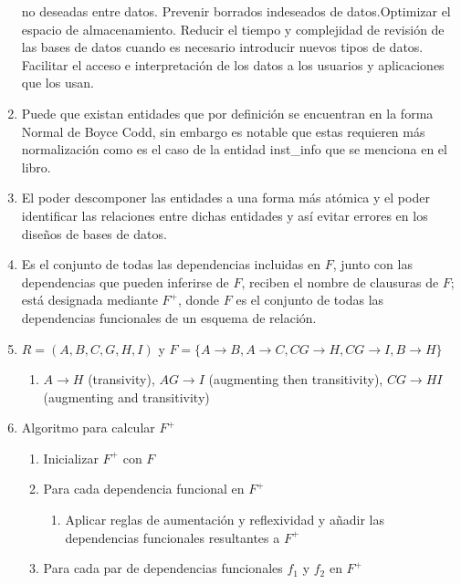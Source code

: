 \documentclass[twoside]{article}
\begin{document}
\begin{enumerate}
            no deseadas entre datos. Prevenir borrados indeseados de datos.Optimizar el espacio de almacenamiento.
            Reducir el tiempo y complejidad de revisión de las bases de datos cuando es necesario introducir nuevos tipos de datos.
            Facilitar el acceso e interpretación de los datos a los usuarios y aplicaciones que los usan.
      \item Puede que existan entidades que por definición se encuentran en la forma Normal de Boyce Codd, sin embargo es notable que
            estas requieren más normalización como es el caso de la entidad inst\_info que se menciona en el libro.
      \item El poder descomponer las entidades a una forma más atómica y el poder identificar las relaciones entre dichas entidades y así
            evitar errores en los diseños de bases de datos.
      \item Es el conjunto de todas las dependencias incluidas en $F$, junto con las dependencias que pueden inferirse de $F$, reciben el nombre
            de clausuras de $F$; está designada mediante $F^+$, donde $F$ es el conjunto de todas las dependencias funcionales de un esquema de relación.
      \item $R = (A, B, C, G, H, I)$ y $F = \{ A \rightarrow B, A \rightarrow C, CG \rightarrow H, CG \rightarrow I, B \rightarrow H \}$
            \begin{enumerate}
                  \item $A \rightarrow H$ (transivity), $AG \rightarrow I$ (augmenting then transitivity), $CG \rightarrow HI$ (augmenting and transitivity)
            \end{enumerate}
      \item Algoritmo para calcular $F^+$
            \begin{enumerate}
                  \item Inicializar $F^+$ con $F$
                  \item Para cada dependencia funcional en $F^+$
                        \begin{enumerate}
                              \item Aplicar reglas de aumentación y reflexividad y añadir las dependencias funcionales resultantes a $F^+$
                        \end{enumerate}
                  \item Para cada par de dependencias funcionales $f_1$ y $f_2$ en $F^+$
                        \begin{enumerate}

\end{enumerate}
\end{enumerate}
\end{enumerate}
\end{document}
